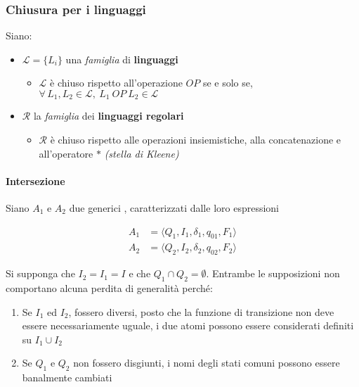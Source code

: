 \documentclass[italian, 10pt]{article}
\begin{document}
\subsubsection{Chiusura per i linguaggi}

Siano:

\begin{itemize}
  \item \(\mathcal{L} = \{L_i\}\) una \textit{famiglia} di \textbf{linguaggi}
        \begin{itemize}
          \item \(\mathcal{L}\) è chiuso rispetto all'operazione \(OP\) se e solo se, \(\forall \, L_1, L_2 \in \mathcal{L}, \ L_1 \ OP \ L_2 \in \mathcal{L} \)
        \end{itemize}
  \item \(\mathcal{R}\) la \textit{famiglia} dei \textbf{linguaggi regolari}
        \begin{itemize}
          \item \(\mathcal{R}\) è chiuso rispetto alle operazioni insiemistiche, alla concatenazione e all'operatore \(\ast\) \textit{(stella di Kleene)}
        \end{itemize}
\end{itemize}

\paragraph{Intersezione}
\label{par:intersezione-FSA}

Siano \(A_1\) e \(A_2\) due generici \FSA, caratterizzati dalle loro espressioni

\begin{align*}
  A_1 & = \langle Q_1, I_1, \delta_1, q_{01}, F_1 \rangle \\
  A_2 & = \langle Q_2, I_2, \delta_2, q_{02}, F_2 \rangle
\end{align*}

Si supponga che \( I_2  = I_1 = I \) e che \(Q_1 \cap Q_2 = \emptyset \).
Entrambe le supposizioni non comportano alcuna perdita di generalità perché:

\begin{enumerate}
  \item Se \(I_1\) ed \(I_2\), fossero diversi, posto che la funzione di transizione non deve essere necessariamente uguale, i due atomi possono essere considerati definiti su \(I_1 \cup I_2\)
  \item Se \(Q_1\) e \(Q_2\) non fossero disgiunti, i nomi degli stati comuni possono essere banalmente cambiati
\end{enumerate}
\end{document}

